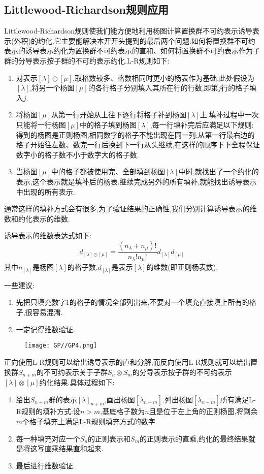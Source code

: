 \documentclass{ctexart}
\begin{document}
\subsection{Littlewood-Richardson规则应用}

Littlewood-Richardson规则使我们能方便地利用杨图计算置换群不可约表示诱导表示(外积)的约化.它主要能解决本开开头提到的最后两个问题:如何将置换群不可约表示的诱导表示约化为置换群不可约表示的直和、如何将置换群不可约表示作为子群的分导表示按子群的不可约表示约化.L-R规则如下:
\begin{enumerate}
    \item 对表示$[\lambda]\odot[\mu]$,取格数较多、格数相同时更小的杨表作为基础,此处假设为$[\lambda]$,将另一个杨图$[\mu]$的各行格子分别填入其所在行的行数,即第$j$行的格子填入$j$.
    \item 将杨图$[\mu]$从第一行开始从上往下逐行将格子补到杨图$[\lambda]$上.填补过程中一次只能将一行杨图$[\mu]$中的格子填到杨图$[\lambda]$,每一行填补完后应满足以下规则:得到的杨图是正则杨图;相同数字的格子不能出现在同一列;从第一行最右边的格子开始往左数、数完一行后换到下一行从头继续,在这样的顺序下下全程保证数字小的格子数不小于数字大的格子数.
    \item 当杨图$[\mu]$中的格子都被使用完、全部填到杨图$[\lambda]$中时,就找出了一个约化的表示,这个表示就是填补后的杨表.继续完成另外的所有填补,就能找出诱导表示中出现的所有表示.
\end{enumerate}

通常这样的填补方式会有很多,为了验证结果的正确性,我们分别计算诱导表示的维数和约化表示的维数.

诱导表示的维数表达式如下:\[d_{[\lambda]\odot[\mu]}=\frac{(n_{\lambda}+n_{\mu})!}{n_{\lambda}!n_{\mu}!}d_{[\lambda]}d_{[\mu]}\]其中$n_{[\lambda]}$是杨图$[\lambda]$的格子数,$d_{[\lambda]}$是表示$[\lambda]$的维数(即正则杨表数).

一些建议:\begin{enumerate}
    \item 先把只填充数字1的格子的情况全部列出来,不要对一个填充直接填上所有的格子,很容易混淆.
    \item 一定记得维数验证.
\end{enumerate}

\begin{figure}[H]
    \centering
    \texttt{[image: GP//GP4.png]}
\end{figure}

正向使用L-R规则可以给出诱导表示的直和分解,而反向使用L-R规则就可以给出置换群$S_{n+m}$的不可约表示关于子群$S_{n}\otimes S_{m}$的分导表示按子群的不可约表示$[\lambda]\otimes[\mu]$约化结果.具体过程如下:\begin{enumerate}
    \item 给出$S_{n+m}$群的表示$[\lambda]_{n+m}$,画出杨图$[\lambda_{n+m}]$.列出杨图$[\lambda_{n+m}]$所有满足L-R规则的填补方式:设$n>m$,基底格子数为$n$且是位于左上角的正则杨图,将剩余$m$个格子填充上满足L-R规则填充方式的数字.
    \item 每一种填充对应一个$S_{n}$的正则表示和$S_{m}$的正则表示的直乘,约化的最终结果就是将这写直乘结果直和起来.
    \item 最后进行维数验证.
\end{enumerate}
\end{document}
